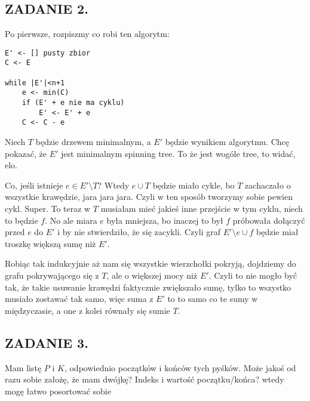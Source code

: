 \documentclass{article}
\begin{document}
\subsection*{ZADANIE 2.}

Po pierwsze, rozpiszmy co robi ten algorytm:


\begin{lstlisting}
E' <- [] pusty zbior
C <- E

while |E'|<n+1
    e <- min(C)
    if (E' + e nie ma cyklu)
        E' <- E' + e
    C <- C - e
\end{lstlisting}

Niech $T$ będzie drzewem minimalnym, a $E'$ będzie wynikiem algorytmu. Chcę pokazać, że $E'$ jest minimalnym spinning tree. To że jest wogóle tree, to widać, elo.

Co, jeśli istnieje $e\in E'\setminus T$? Wtedy $e\cup T$ będzie miało cykle, bo $T$ zachaczało o wszystkie krawędzie, jara jara jara. Czyli w ten sposób tworzymy sobie pewien cykl. Super. To teraz w $T$ musiałam mieć jakieś inne przejście w tym cyklu, niech to będzie $f$. No ale miara $e$ była mniejsza, bo inaczej to był $f$ próbowała dołączyć przed $e$ do $E'$ i by nie stwierdziło, że się zacykli. Czyli graf $E'\setminus e\cup f$ będzie miał troszkę większą sumę niż $E'$. 

Robiąc tak indukcyjnie aż nam się wszystkie wierzchołki pokryją, dojdziemy do grafu pokrywającego się z $T$, ale o większej mocy niż $E'$. Czyli to nie mogło być tak, że takie usuwanie krawędzi faktycznie zwiększało sumę, tylko to wszystko musiało zostawać tak samo, więc suma z $E'$ to to samo co te sumy w międzyczasie, a one z kolei równały się sumie $T$.

\subsection*{ZADANIE 3.}

Mam listę $P$ i $K$, odpowiednio początków i końców tych pyśków. Może jakoś od razu sobie założę, że mam dwójkę? Indeks i wartość początku/końca? wtedy mogę łatwo posortować sobie 
\end{document}
